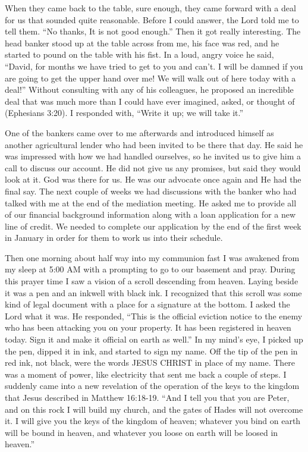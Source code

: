 \documentclass[oneside]{book}
\begin{document}
When they came back to the table, sure enough, they came forward with a deal for us that sounded quite reasonable. Before I could answer, the Lord told me to tell them. “No thanks, It is not good enough.” Then it got really interesting. The head banker stood up at the table across from me, his face was red, and he started to pound on the table with his fist. In a loud, angry voice he said, “David, for months we have tried to get to you and can't. I will be damned if you are going to get the upper hand over me! We will walk out of here today with a deal!” Without consulting with any of his colleagues, he proposed an incredible deal that was much more than I could have ever imagined, asked, or thought of (Ephesians 3:20). I responded with, “Write it up; we will take it.” 

One of the bankers came over to me afterwards and introduced himself as another agricultural lender who had been invited to be there that day. He said he was impressed with how we had handled ourselves, so he invited us to give him a call to discuss our account. He did not give us any promises, but said they would look at it. God was there for us. He was our advocate once again and He had the final say. The next couple of weeks we had discussions with the banker who had talked with me at the end of the mediation meeting. He asked me to provide all of our financial background information along with a loan application for a new line of credit. We needed to complete our application by the end of the first week in January in order for them to work us into their schedule.

Then one morning about half way into my communion fast I was awakened from my sleep at 5:00 AM with a prompting to go to our basement and pray. During this prayer time I saw a vision of a scroll descending from heaven. Laying beside it was a pen and an inkwell with black ink. I recognized that this scroll was some kind of legal document with a place for a signature at the bottom. I asked the Lord what it was. He responded, “This is the official eviction notice to the enemy who has been attacking you on your property. It has been registered in heaven today. Sign it and make it official on earth as well.” In my mind’s eye, I picked up the pen, dipped it in ink, and started to sign my name. Off the tip of the pen in red ink, not black, were the words JESUS CHRIST in place of my name. There was a moment of power, like electricity that sent me back a couple of steps. I suddenly came into a new revelation of the operation of the keys to the kingdom that Jesus described in Matthew 16:18-19. “And I tell you that you are Peter, and on this rock I will build my church, and the gates of Hades will not overcome it. I will give you the keys of the kingdom of heaven; whatever you bind on earth will be bound in heaven, and whatever you loose on earth will be loosed in heaven.” 
\end{document}
